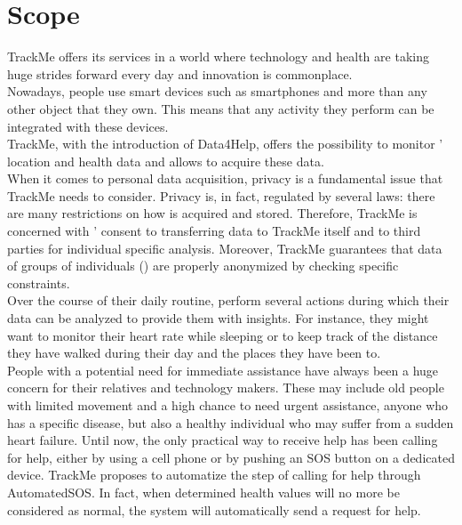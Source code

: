 \documentclass[../../rasd.tex]{subfiles}
\begin{document}
\section{Scope}
TrackMe offers its services in a world where technology and health are taking huge strides forward every day and innovation is commonplace.\\
Nowadays, people use smart devices such as smartphones and  more than any other object that they own. This means that any activity they perform can be integrated with these devices.\\
TrackMe, with the introduction of Data4Help, offers the possibility to monitor ’ location and health data and allows  to acquire these data.\\

When it comes to personal data acquisition, privacy is a fundamental issue that TrackMe needs to consider. Privacy is, in fact, regulated by several laws: there are many restrictions on how  is acquired and stored. Therefore, TrackMe is concerned with ’ consent to transferring data to TrackMe itself and to third parties for individual specific analysis. Moreover, TrackMe guarantees that data of groups of individuals () are properly anonymized by checking specific constraints.\\

Over the course of their daily routine,  perform several actions during which their data can be analyzed to provide them with insights. For instance, they might want to monitor their heart rate while sleeping or to keep track of the distance they have walked during their day and the places they have been to.\\

People with a potential need for immediate assistance have always been a huge concern for their relatives and technology makers. These may include old people with limited movement and a high chance to need urgent assistance, anyone who has a specific disease, but also a healthy individual who may suffer from a sudden heart failure. Until now, the only practical way to receive help has been calling for help, either by using a cell phone or by pushing an SOS button on a dedicated device. TrackMe proposes to automatize the step of calling for help through AutomatedSOS. In fact, when determined health values will no more be considered as normal, the system will automatically send a request for help.\\
\end{document}
